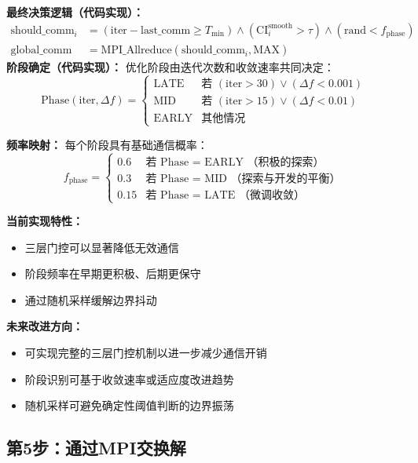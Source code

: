 \documentclass[11pt,a3paper]{ctexart}
\begin{document}
\textbf{最终决策逻辑（代码实现）：}
\begin{align}
\text{should\_comm}_i &= (\text{iter} - \text{last\_comm} \geq T_{\min}) \land (\text{CI}_i^{\text{smooth}} > \tau) \land (\text{rand}<f_{\text{phase}}) \\
\text{global\_comm} &= \text{MPI\_Allreduce}(\text{should\_comm}_i, \text{MAX})
\end{align}
\textbf{阶段确定（代码实现）：} 优化阶段由迭代次数和收敛速率共同决定：
\begin{equation}
\text{Phase}(\text{iter}, \Delta f) = \begin{cases}
\text{LATE} & \text{若 } (\text{iter} > 30) \lor (\Delta f < 0.001) \\
\text{MID} & \text{若 } (\text{iter} > 15) \lor (\Delta f < 0.01) \\
\text{EARLY} & \text{其他情况}
\end{cases}
\end{equation}

\textbf{频率映射：} 每个阶段具有基础通信概率：
\begin{equation}
f_{\text{phase}} = \begin{cases}
0.6 & \text{若 Phase = EARLY （积极的探索）} \\
0.3 & \text{若 Phase = MID （探索与开发的平衡）} \\
0.15 & \text{若 Phase = LATE （微调收敛）}
\end{cases}
\end{equation}

\textbf{当前实现特性：}
\begin{itemize}
    \item 三层门控可以显著降低无效通信
    \item 阶段频率在早期更积极、后期更保守
    \item 通过随机采样缓解边界抖动
\end{itemize}


\textbf{未来改进方向：}
\begin{itemize}
    \item 可实现完整的三层门控机制以进一步减少通信开销
    \item 阶段识别可基于收敛速率或适应度改进趋势
    \item 随机采样可避免确定性阈值判断的边界振荡
\end{itemize}
\subsection{第5步：通过MPI交换解}
\end{document}
